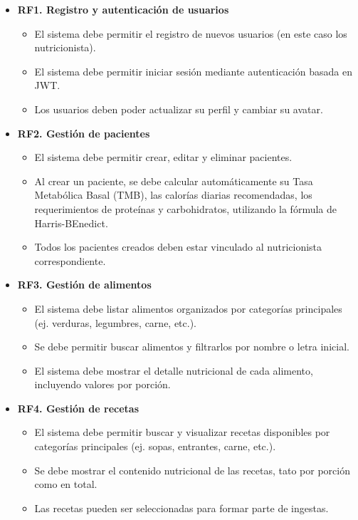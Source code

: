 \begin{itemize}
    \item \textbf{RF1. Registro y autenticación de usuarios}
    \begin{itemize}
        \item El sistema debe permitir el registro de nuevos usuarios (en este caso los nutricionista).
        \item El sistema debe permitir iniciar sesión mediante autenticación basada en JWT.
        \item Los usuarios deben poder actualizar su perfil y cambiar su avatar.
    \end{itemize}

    \item \textbf{RF2. Gestión de pacientes}
    \begin{itemize}
        \item El sistema debe permitir crear, editar y eliminar pacientes.
        \item Al crear un paciente, se debe calcular automáticamente su Tasa Metabólica Basal (TMB), las calorías diarias recomendadas, los requerimientos de proteínas y carbohidratos, utilizando la fórmula de Harris-BEnedict.
        \item Todos los pacientes creados deben estar vinculado al nutricionista correspondiente.
    \end{itemize}  

    \item \textbf{RF3. Gestión de alimentos}
    \begin{itemize}
        \item El sistema debe listar alimentos organizados por categorías principales (ej. verduras, legumbres, carne, etc.).
        \item Se debe permitir buscar alimentos y filtrarlos por nombre o letra inicial.
        \item El sistema debe mostrar el detalle nutricional de cada alimento, incluyendo valores por porción.
    \end{itemize}

    \item \textbf{RF4. Gestión de recetas}
    \begin{itemize}
        \item El sistema debe permitir buscar y visualizar recetas disponibles por categorías principales (ej. sopas, entrantes, carne, etc.).
        \item Se debe mostrar el contenido nutricional de las recetas, tato por porción como en total.
       \item Las recetas pueden ser seleccionadas para formar parte de ingestas. 
    \end{itemize}


\end{itemize}
